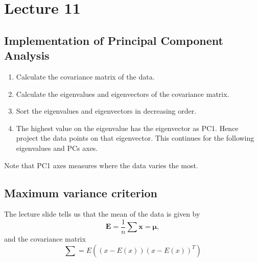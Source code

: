 \documentclass[12pt]{article}
\numberwithin{equation}{section}
\begin{document}
\section{Lecture 11}
\subsection{Implementation of Principal Component Analysis}
\begin{enumerate}
    \item Calculate the covariance matrix of the data.
    \item Calculate the eigenvalues and eigenvectors of the covariance matrix.
    \item Sort the eigenvalues and eigenvectors in decreasing order.
    \item The highest value on the eigenvalue has the eigenvector as PC1. Hence project the data points on that eigenvector. This continues for the following eigenvalues and PCs axes.
\end{enumerate}
Note that PC1 axes measures where the data varies the most. 
\subsection{Maximum variance criterion}
The lecture slide tells us that the mean of the data is given by
\begin{equation}
    \bm{E} = \frac{1}{n} \sum \bm{x} = \bm{\mu},
\end{equation}
and the covariance matrix
\begin{equation}
    \sum =  E((x-E(x))(x-E(x))^T)
\end{equation}
\end{document}
